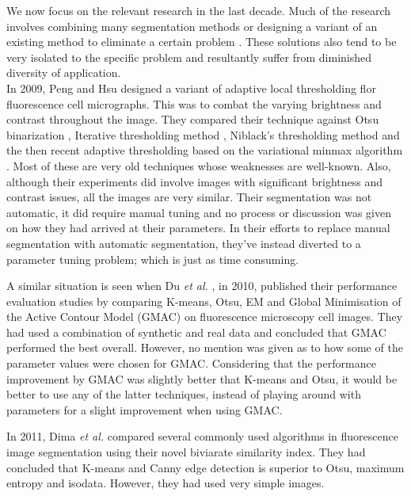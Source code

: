 \begin{definition}
	We now focus on the relevant research in the last decade. Much of the research involves combining many segmentation methods or designing a variant of an existing method to eliminate a certain problem \cite{Smochina2011,Meijering2012}. These solutions also tend to be very isolated to the specific problem and resultantly suffer from diminished diversity of application.\\
	
	In 2009, Peng and Hsu \cite{Peng2009} designed a variant of adaptive local thresholding flor fluorescence cell micrographs. This was to combat the varying brightness and contrast throughout the image. They compared their technique against Otsu binarization \cite{Otsu1979}, Iterative thresholding method \cite{Ridler1978}, Niblack's thresholding method \cite{Niblack1986} and the then recent adaptive thresholding based on the variational minmax algorithm \cite{Saha2009}. Most of these are very old techniques whose weaknesses are well-known. Also, although their experiments did involve images with significant brightness and contrast issues, all the images are very similar. Their segmentation was not automatic, it did require manual tuning and no process or discussion was given on how they had arrived at their parameters. In their efforts to replace manual segmentation with automatic segmentation, they've instead diverted to a parameter tuning problem; which is just as time consuming.
	
	A similar situation is seen when Du \textit{et al.} \cite{Du2010}, in 2010, published their performance evaluation studies by comparing K-means, Otsu, EM and Global Minimisation of the Active Contour Model (GMAC) on fluorescence microscopy cell images. They had used a combination of synthetic and real data and concluded that GMAC performed the best overall. However, no mention was given as to how some of the parameter values were chosen for GMAC. Considering that the performance improvement by GMAC was slightly better that K-means and Otsu, it would be better to use any of the latter techniques, instead of playing around with parameters for a slight improvement when using GMAC.
	
	In 2011, Dima \textit{et al.} \cite{Dima2011} compared several commonly used algorithms in fluorescence image segmentation using their novel biviarate similarity index. They had concluded that K-means and Canny edge detection is superior to Otsu, maximum entropy and isodata. However, they had used very simple images.
	

\end{definition}

